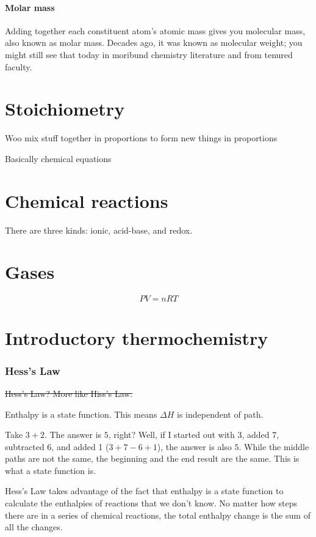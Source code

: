 \documentclass[letterpaper, 12pt]{article}
\begin{document}
	\subsection{Molar mass}
	Adding together each constituent atom's atomic mass gives you molecular mass, also known as molar mass. Decades ago, it was known as molecular weight; you might still see that today in moribund chemistry literature and from tenured faculty.

\clearpage

\part{Stoichiometry}
Woo mix stuff together in proportions to form new things in proportions

Basically chemical equations

\clearpage

\part{Chemical reactions}
There are three kinds: ionic, acid-base, and redox.

\clearpage

\part{Gases}

$$PV = nRT$$

\clearpage

\part{Introductory thermochemistry}

\section{Hess's Law}
\st{Hess's Law? More like Hiss's Law.}

Enthalpy is a state function. This means $\Delta H$ is independent of path.

Take $3 + 2$. The answer is $5$, right? Well, if I started out with 3, added 7, subtracted 6, and added 1 ($3 + 7 - 6 + 1$), the answer is also $5$. While the middle paths are not the same, the beginning and the end result are the same. This is what a state function is.

Hess's Law takes advantage of the fact that enthalpy is a state function to calculate the enthalpies of reactions that we don't know. No matter how steps there are in a series of chemical reactions, the total enthalpy change is the sum of all the changes.
\end{document}

